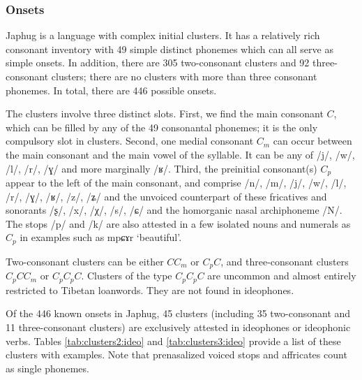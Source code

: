 \documentclass[oldfontcommands,oneside,a4paper,11pt]{article}
\newcommand{\ipa}[1]{{\phon \mbox{#1}}} %
\begin{document}
 \subsubsection{Onsets}
 Japhug is a language with complex initial clusters. It has a relatively rich consonant inventory with 49 simple distinct phonemes which can all serve as simple onsets. In addition, there are 305   two-consonant  clusters and 92  three-consonant clusters; there are no clusters with more than three consonant phonemes. In total, there are  446 possible onsets.
 
The clusters involve three distinct slots. First, we find the main consonant $C$, which can be filled by any of the 49 consonantal phonemes; it is the only compulsory slot in clusters. Second,  one medial consonant $C_m$  can occur between the main consonant and the main vowel of the syllable. It can be any of /\ipa{j}/, /\ipa{w}/, /\ipa{l}/, /\ipa{r}/, /\ipa{ɣ}/ and more marginally /\ipa{ʁ}/. Third, the preinitial consonant(s) $C_p$ appear to the left of the main consonant, and comprise /\ipa{n}/, /\ipa{m}/,   /\ipa{j}/, /\ipa{w}/, /\ipa{l}/, /\ipa{r}/, /\ipa{ɣ}/,   /\ipa{ʁ}/, /\ipa{z}/, /\ipa{ʑ}/ and the unvoiced counterpart of these fricatives and sonorants /\ipa{ʂ}/, /\ipa{x}/,   /\ipa{χ}/, /\ipa{s}/, /\ipa{ɕ}/ and  the homorganic nasal archiphoneme /N/. The stops /\ipa{p}/ and /\ipa{k}/ are also attested in a few isolated nouns and numerals as $C_p$ in examples such as \ipa{mpɕɤr} `beautiful'.

Two-consonant clusters can be either $CC_m$ or $C_pC$, and three-consonant clusters $C_pCC_m$ or $C_pC_pC$. Clusters of the type  $C_pC_pC$ are uncommon and almost entirely restricted to Tibetan loanwords. They are not found in ideophones.
 
 Of the 446 known onsets in Japhug, 45 clusters (including 35 two-consonant and 11 three-consonant clusters) are exclusively attested in ideophones or ideophonic verbs. Tables \ref{tab:clusters2:ideo} and   \ref{tab:clusters3:ideo} provide a list of these clusters with examples. Note that prenasalized voiced stops and affricates count as single phonemes.
 
\end{document}
